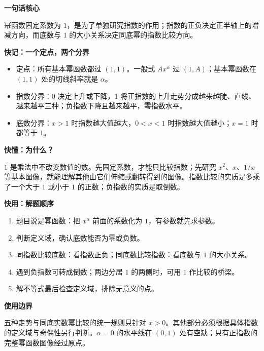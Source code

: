 \clearpage
\begin{summarybox}


  \textbf{\textcolor{CSummary}{一句话核心}}

  幂函数固定系数为 $1$，是为了单独研究指数的作用；指数的正负决定正半轴上的增减方向，而底数与 $1$ 的大小关系决定同底幂的指数比较方向。

  \medskip
  \textbf{\textcolor{CSummary}{快记：一个定点，两个分界}}
  \begin{itemize}[leftmargin=*,itemsep=0.35em]
    \item 定点：所有基本幂函数都过 $(1,1)$。一般式 $Ax^\alpha$ 过 $(1,A)$；基本幂函数在 $(1,1)$ 处的切线斜率就是 $\alpha$。
    \item 指数分界：$0$ 决定上升或下降，$1$ 将正指数的上升走势分成越来越陡、直线、越来越平三种；负指数下降且越来越平，零指数水平。
    \item 底数分界：$x>1$ 时指数越大值越大，$0<x<1$ 时指数越大值越小；$x=1$ 时都等于 $1$。
  \end{itemize}

  \medskip
  \textbf{\textcolor{CSummary}{快懂：为什么？}}

  $1$ 是乘法中不改变数值的数。先固定系数，才能只比较指数；先研究 $x^2$、$x$、$1/x$ 等基本图像，就能理解其他由它们伸缩或翻转得到的图像。指数比较的实质是多乘了一个大于 $1$ 或小于 $1$ 的正数；负指数的实质是取倒数。

  \medskip
\end{summarybox}
\clearpage
\begin{summarybox}
  \textbf{\textcolor{CSummary}{快用：解题顺序}}
  \begin{enumerate}[leftmargin=*,itemsep=0.3em]
    \item 题目说是幂函数：把 $x^\alpha$ 前面的系数化为 $1$，有参数就先求参数。
    \item 判断定义域，确认底数能否为零或负数。
    \item 同指数比较底数：看指数正负；同底数比较指数：看底数与 $1$ 的大小关系。
    \item 遇到负指数可转成倒数；两边分居 $1$ 的两侧时，可用 $1$ 作比较的桥梁。
    \item 解不等式最后检查定义域，排除无意义的点。
  \end{enumerate}

  \medskip
  \textbf{\textcolor{CSummary}{使用边界}}

  五种走势与同底实数幂比较的统一规则只针对 $x>0$。其他部分必须根据具体指数的定义域与奇偶性另行判断。$\alpha=0$ 的水平线在 $(0,1)$ 处有空缺；只有正指数的完整幂函数图像经过原点。
\end{summarybox}
